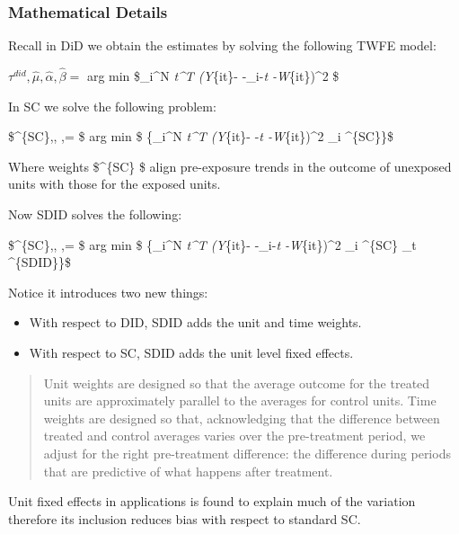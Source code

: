\documentclass[
]{article}
\providecommand{\tightlist}{%
  \setlength{\itemsep}{0pt}\setlength{\parskip}{0pt}}
\begin{document}
\hypertarget{mathematical-details}{%
\subsubsection{Mathematical Details}\label{mathematical-details}}

Recall in DiD we obtain the estimates by solving the following TWFE
model:

\(\tau ^{did},\hat{\mu}, \hat{\alpha},\hat{\beta }=\) arg min
\$\sum\_i\^{}N \sum\emph{t\^{}T (Y}\{it\}- \mu -\alpha\_i-\beta\emph{t
-W}\{it\}\tau)\^{}2 \$

In SC we solve the following problem:

\$\tau \^{}\{SC\},\hat{\mu}, \hat{\alpha},\hat{\beta }= \$ arg min \$
\{\sum\_i\^{}N \sum\emph{t\^{}T (Y}\{it\}- \mu -\beta\emph{t
-W}\{it\}\tau)\^{}2 \omega\_i \^{}\{SC\}\}\$

Where weights \$\omega \^{}\{SC\} \$ align pre-exposure trends in the
outcome of unexposed units with those for the exposed units.

Now SDID solves the following:

\$\tau \^{}\{SC\},\hat{\mu}, \hat{\alpha},\hat{\beta }= \$ arg min \$
\{\sum\_i\^{}N \sum\emph{t\^{}T (Y}\{it\}- \mu -\alpha\_i-\beta\emph{t
-W}\{it\}\tau)\^{}2 \omega\_i \^{}\{SC\} \lambda\_t \^{}\{SDID\}\}\$

Notice it introduces two new things:

\begin{itemize}
\tightlist
\item
  With respect to DID, SDID adds the unit and time weights.
\item
  With respect to SC, SDID adds the unit level fixed effects.
\end{itemize}

\begin{quote}
Unit weights are designed so that the average outcome for the treated
units are approximately parallel to the averages for control units. Time
weights are designed so that, acknowledging that the difference between
treated and control averages varies over the pre-treatment period, we
adjust for the right pre-treatment difference: the difference during
periods that are predictive of what happens after treatment.
\end{quote}

Unit fixed effects in applications is found to explain much of the
variation therefore its inclusion reduces bias with respect to standard
SC.
\end{document}

